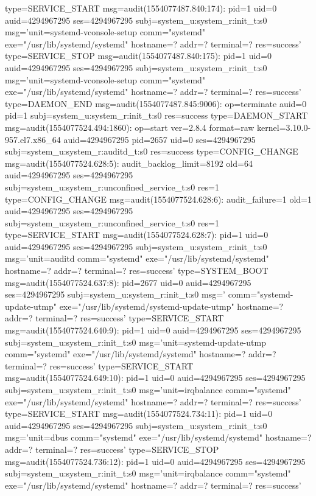 \documentclass[]{report}
\newenvironment{Shaded}{}{}
\newcommand{\NormalTok}[1]{#1}
\begin{document}
\begin{Shaded}
\begin{Highlighting}[]
\NormalTok{type=SERVICE_START msg=audit(1554077487.840:174): pid=1 uid=0 auid=4294967295 ses=4294967295 subj=system_u:system_r:init_t:s0 msg='unit=systemd-vconsole-setup comm="systemd" exe="/usr/lib/systemd/systemd" hostname=? addr=? terminal=? res=success'}
\NormalTok{type=SERVICE_STOP msg=audit(1554077487.840:175): pid=1 uid=0 auid=4294967295 ses=4294967295 subj=system_u:system_r:init_t:s0 msg='unit=systemd-vconsole-setup comm="systemd" exe="/usr/lib/systemd/systemd" hostname=? addr=? terminal=? res=success'}
\NormalTok{type=DAEMON_END msg=audit(1554077487.845:9006): op=terminate auid=0 pid=1 subj=system_u:system_r:init_t:s0 res=success}
\NormalTok{type=DAEMON_START msg=audit(1554077524.494:1860): op=start ver=2.8.4 format=raw kernel=3.10.0-957.el7.x86_64 auid=4294967295 pid=2657 uid=0 ses=4294967295 subj=system_u:system_r:auditd_t:s0 res=success}
\NormalTok{type=CONFIG_CHANGE msg=audit(1554077524.628:5): audit_backlog_limit=8192 old=64 auid=4294967295 ses=4294967295 subj=system_u:system_r:unconfined_service_t:s0 res=1}
\NormalTok{type=CONFIG_CHANGE msg=audit(1554077524.628:6): audit_failure=1 old=1 auid=4294967295 ses=4294967295 subj=system_u:system_r:unconfined_service_t:s0 res=1}
\NormalTok{type=SERVICE_START msg=audit(1554077524.628:7): pid=1 uid=0 auid=4294967295 ses=4294967295 subj=system_u:system_r:init_t:s0 msg='unit=auditd comm="systemd" exe="/usr/lib/systemd/systemd" hostname=? addr=? terminal=? res=success'}
\NormalTok{type=SYSTEM_BOOT msg=audit(1554077524.637:8): pid=2677 uid=0 auid=4294967295 ses=4294967295 subj=system_u:system_r:init_t:s0 msg=' comm="systemd-update-utmp" exe="/usr/lib/systemd/systemd-update-utmp" hostname=? addr=? terminal=? res=success'}
\NormalTok{type=SERVICE_START msg=audit(1554077524.640:9): pid=1 uid=0 auid=4294967295 ses=4294967295 subj=system_u:system_r:init_t:s0 msg='unit=systemd-update-utmp comm="systemd" exe="/usr/lib/systemd/systemd" hostname=? addr=? terminal=? res=success'}
\NormalTok{type=SERVICE_START msg=audit(1554077524.649:10): pid=1 uid=0 auid=4294967295 ses=4294967295 subj=system_u:system_r:init_t:s0 msg='unit=irqbalance comm="systemd" exe="/usr/lib/systemd/systemd" hostname=? addr=? terminal=? res=success'}
\NormalTok{type=SERVICE_START msg=audit(1554077524.734:11): pid=1 uid=0 auid=4294967295 ses=4294967295 subj=system_u:system_r:init_t:s0 msg='unit=dbus comm="systemd" exe="/usr/lib/systemd/systemd" hostname=? addr=? terminal=? res=success'}
\NormalTok{type=SERVICE_STOP msg=audit(1554077524.736:12): pid=1 uid=0 auid=4294967295 ses=4294967295 subj=system_u:system_r:init_t:s0 msg='unit=irqbalance comm="systemd" exe="/usr/lib/systemd/systemd" hostname=? addr=? terminal=? res=success'}

\end{Highlighting}
\end{Shaded}
\end{document}
